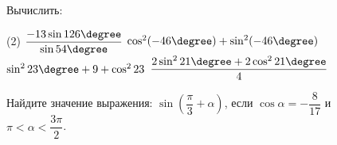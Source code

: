 %
%

\begin{class}[number=1]
	\begin{listofex} %
		\item Вычислить: %
		\begin{tasks}(2)
			\task \( \dfrac{-13\sin126\degree}{\sin54\degree} \)
			\task \( \cos^2(-46\degree)+\sin^2(-46\degree) \)
			\task \( \sin^223\degree+9+\cos^223 \)
			\task \( \dfrac{2\sin^221\degree+2\cos^221\degree}{4} \)
		\end{tasks}
		\item Найдите значение выражения: \( \sin\left( \dfrac{\pi}{3}+\alpha \right) \), если \( \cos\alpha=-\dfrac{8}{17} \) и \\ \( \pi<\alpha<\dfrac{3\pi}{2} \).
		

\end{listofex}
\end{class}
